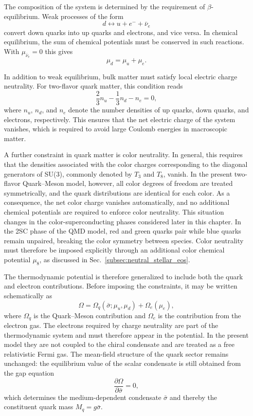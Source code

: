 The composition of the system is determined by the requirement of
$\beta$-equilibrium. Weak processes of the form
\[
d \leftrightarrow u + e^- + \bar{\nu}_e
\]
convert down quarks into up quarks and electrons, and vice versa.
In chemical equilibrium, the sum of chemical potentials must be
conserved in such reactions. With $\mu_{\bar{\nu}_e} = 0$ this
gives
\begin{equation}
\mu_d = \mu_u + \mu_e.
\label{eq:qs_beta_eq}
\end{equation}

In addition to weak equilibrium, bulk matter must satisfy local
electric charge neutrality. For two-flavor quark matter, this condition
reads
\begin{equation}
\frac{2}{3} n_u - \frac{1}{3} n_d - n_e = 0,
\label{eq:qs_charge_neutrality_sub}
\end{equation}
where \(n_u\), \(n_d\), and \(n_e\) denote the number densities of
up quarks, down quarks, and electrons, respectively. This ensures that
the net electric charge of the system vanishes, which is required to
avoid large Coulomb energies in macroscopic matter.

A further constraint in quark matter is color neutrality. In general,
this requires that the densities associated with the color charges
corresponding to the diagonal generators of SU(3), commonly denoted
by \(T_3\) and \(T_8\), vanish. In the present two-flavor
Quark--Meson model, however, all color degrees of freedom are treated
symmetrically, and the quark distributions are identical for each
color. As a consequence, the net color charge vanishes automatically,
and no additional chemical potentials are required to enforce color
neutrality.
This situation changes in the color-superconducting phases considered
later in this chapter. In the 2SC phase of the QMD model, red and green quarks pair while
blue quarks remain unpaired, breaking the color symmetry between
species. Color neutrality must therefore be imposed explicitly through
an additional color chemical potential $\mu_8$, as discussed in
Sec.~\ref{subsec:neutral_stellar_eos}.

The thermodynamic potential is therefore generalized to include both
the quark and electron contributions. Before imposing the constraints,
it may be written schematically as
\begin{equation}
\Omega = \Omega_q(\bar{\sigma};\mu_u,\mu_d) + \Omega_e(\mu_e),
\end{equation}
where \(\Omega_q\) is the Quark--Meson contribution and \(\Omega_e\)
is the contribution from the electron gas. The electrons required by
charge neutrality are part of the thermodynamic system and must
therefore appear in the potential. In the present model they are not
coupled to the chiral condensate and are treated as a free relativistic
Fermi gas. The mean-field structure of the quark sector remains
unchanged: the equilibrium value of the scalar condensate is still
obtained from the gap equation
\begin{equation}
\frac{\partial \Omega}{\partial \bar{\sigma}} = 0,
\label{eq:qs_gap_eq_stellar}
\end{equation}
which determines the medium-dependent condensate \(\bar{\sigma}\) and
thereby the constituent quark mass $M_q = g\bar{\sigma}$.

